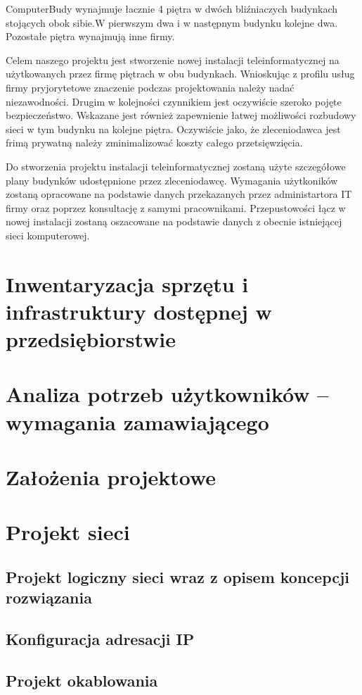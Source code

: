 \documentclass{report}
\begin{document}
ComputerBudy wynajmuje łacznie 4 piętra w dwóch bliźniaczych budynkach stojących obok sibie.W pierwszym dwa i w następnym budynku kolejne dwa.
Pozostałe piętra wynajmują inne firmy.

Celem naszego projektu jest stworzenie nowej instalacji teleinformatycznej na użytkowanych przez firmę piętrach w obu budynkach. Wnioskując z
profilu usług firmy pryjorytetowe znaczenie podczas projektowania należy nadać niezawodności. Drugim w kolejności czynnikiem jest oczywiście
szeroko pojęte bezpieczeństwo. Wskazane jest również zapewnienie łatwej możliwości rozbudowy sieci w tym budynku na kolejne piętra.
Oczywiście jako, że zleceniodawca jest frimą prywatną należy zminimalizować koszty całego przetsięwzięcia.

Do stworzenia projektu instalacji teleinformatycznej zostaną użyte szczegółowe plany budynków udostępnione przez zleceniodawcę.
Wymagania użytkoników zostaną opracowane na podstawie danych przekazanych przez administartora IT firmy oraz poprzez konsultację
z samymi pracownikami. Przepustowości łącz w nowej instalacji zostaną oszacowane na podstawie danych z obecnie istniejącej sieci komputerowej.

\chapter{Inwentaryzacja sprzętu i infrastruktury dostępnej w przedsiębiorstwie}
\chapter{Analiza potrzeb użytkowników – wymagania zamawiającego}
\chapter{Założenia projektowe}
\chapter{Projekt sieci}
\section{Projekt logiczny sieci wraz z opisem koncepcji rozwiązania}
\section{Konfiguracja adresacji IP}
\section{Projekt okablowania}
\end{document}
